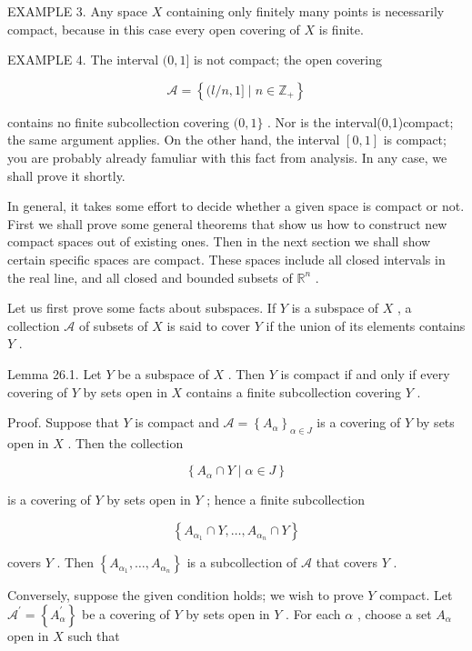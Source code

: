 EXAMPLE 3. Any space \(X\) containing only finitely many points is necessarily compact, because in this case every open covering of \(X\) is finite.

EXAMPLE 4. The interval \((0,1\rbrack\) is not compact; the open covering

\[
\mathcal{A} = \left\{  {(l/n,1\rbrack  \mid  n \in  {\mathbb{Z}}_{ + }}\right\}
\]

contains no finite subcollection covering \((0,1\}\) . Nor is the interval(0,1)compact; the same argument applies. On the other hand, the interval \(\left\lbrack  {0,1}\right\rbrack\) is compact; you are probably already famuliar with this fact from analysis. In any case, we shall prove it shortly.

In general, it takes some effort to decide whether a given space is compact or not. First we shall prove some general theorems that show us how to construct new compact spaces out of existing ones. Then in the next section we shall show certain specific spaces are compact. These spaces include all closed intervals in the real line, and all closed and bounded subsets of \({\mathbb{R}}^{n}\) .

Let us first prove some facts about subspaces. If \(Y\) is a subspace of \(X\) , a collection \(\mathcal{A}\) of subsets of \(X\) is said to cover \(Y\) if the union of its elements contains \(Y\) .

Lemma 26.1. Let \(Y\) be a subspace of \(X\) . Then \(Y\) is compact if and only if every covering of \(Y\) by sets open in \(X\) contains a finite subcollection covering \(Y\) .

Proof. Suppose that \(Y\) is compact and \(\mathcal{A} = {\left\{  {A}_{\alpha }\right\}  }_{\alpha  \in  J}\) is a covering of \(Y\) by sets open in \(X\) . Then the collection

\[
\left\{  {{A}_{\alpha } \cap  Y \mid  \alpha  \in  J}\right\}
\]

is a covering of \(Y\) by sets open in \(Y\) ; hence a finite subcollection

\[
\left\{  {{A}_{{\alpha }_{1}} \cap  Y,\ldots ,{A}_{{\alpha }_{n}} \cap  Y}\right\}
\]

covers \(Y\) . Then \(\left\{  {{A}_{{\alpha }_{1}},\ldots ,{A}_{{\alpha }_{n}}}\right\}\) is a subcollection of \(\mathcal{A}\) that covers \(Y\) .

Conversely, suppose the given condition holds; we wish to prove \(Y\) compact. Let \({\mathcal{A}}^{\prime } = \left\{  {A}_{\alpha }^{\prime }\right\}\) be a covering of \(Y\) by sets open in \(Y\) . For each \(\alpha\) , choose a set \({A}_{\alpha }\) open in \(X\) such that

